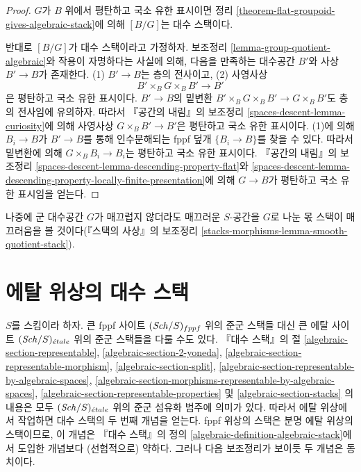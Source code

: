\begin{proof}
$G$가 $B$ 위에서 평탄하고 국소 유한 표시이면 정리
\ref{theorem-flat-groupoid-gives-algebraic-stack}에 의해 $[B/G]$는
대수 스택이다.

\medskip\noindent
반대로 $[B/G]$가 대수 스택이라고 가정하자. 보조정리
\ref{lemma-group-quotient-algebraic}와 작용이 자명하다는 사실에 의해,
다음을 만족하는 대수공간 $B'$와 사상 $B' \to B$가 존재한다.
(1) $B' \to B$는 층의 전사이고, (2) 사영사상
$$
B' \times_B G \times_B B' \to B'
$$
은 평탄하고 국소 유한 표시이다. $B' \to B$의 밑변환
$B' \times_B G \times_B B' \to G \times_B B'$도 층의 전사임에
유의하자. 따라서 『공간의 내림』의 보조정리
\ref{spaces-descent-lemma-curiosity}에 의해 사영사상
$G \times_B B' \to B'$은 평탄하고 국소 유한 표시이다. (1)에 의해
$B_i \to B$가 $B' \to B$를 통해 인수분해되는 fppf 덮개
$\{B_i \to B\}$를 찾을 수 있다. 따라서 밑변환에 의해
$G \times_B B_i \to B_i$는 평탄하고 국소 유한 표시이다.
『공간의 내림』의 보조정리
\ref{spaces-descent-lemma-descending-property-flat}와
\ref{spaces-descent-lemma-descending-property-locally-finite-presentation}에
의해 $G \to B$가 평탄하고 국소 유한 표시임을 얻는다.
\end{proof}

\noindent
나중에 군 대수공간 $G$가 매끄럽지 않더라도 매끄러운 $S$-공간을
$G$로 나눈 몫 스택이 매끄러움을 볼 것이다(『스택의 사상』의 보조정리
\ref{stacks-morphisms-lemma-smooth-quotient-stack}).




\section{에탈 위상의 대수 스택}
\label{section-stacks-etale}

\noindent
$S$를 스킴이라 하자. 큰 fppf 사이트 $(\mathit{Sch}/S)_{fppf}$ 위의 준군
스택들 대신 큰 에탈 사이트 $(\mathit{Sch}/S)_{\acute{e}tale}$ 위의 준군 스택들을
다룰 수도 있다. 『대수 스택』의 절
\ref{algebraic-section-representable},
\ref{algebraic-section-2-yoneda},
\ref{algebraic-section-representable-morphism},
\ref{algebraic-section-split},
\ref{algebraic-section-representable-by-algebraic-spaces},
\ref{algebraic-section-morphisms-representable-by-algebraic-spaces},
\ref{algebraic-section-representable-properties} 및
\ref{algebraic-section-stacks}
의 내용은 모두 $(\mathit{Sch}/S)_{\acute{e}tale}$ 위의 준군 섬유화 범주에 의미가 있다.
따라서 에탈 위상에서 작업하면 대수 스택의 두 번째 개념을 얻는다.
fppf 위상의 스택은 분명 에탈 위상의 스택이므로, 이 개념은
『대수 스택』의 정의 \ref{algebraic-definition-algebraic-stack}에서
도입한 개념보다 (선험적으로) 약하다. 그러나 다음 보조정리가 보이듯
두 개념은 동치이다.

